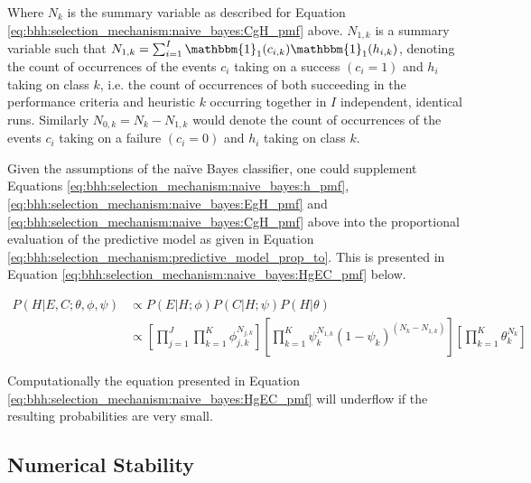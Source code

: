 Where $N_{k}$ is the summary variable as described for Equation \ref{eq:bhh:selection_mechanism:naive_bayes:CgH_pmf} above.
$N_{1,k}$ is a summary variable such that $N_{1,k} = \sum_{i=1}^{I}
      \mathbbm{1}_{1}(c_{i,k})\mathbbm{1}_{1}(h_{i,k})$, denoting the count of
occurrences of the events $c_{i}$ taking on a success $(c_{i}=1)$ and $h_{i}$
taking on class $k$, i.e. the count of occurrences of both succeeding in the
performance criteria and heuristic $k$ occurring together in $I$ independent,
identical runs. Similarly $N_{0,k} = N_{k} - N_{1,k}$ would denote the count of
occurrences of the events $c_{i}$ taking on a failure $(c_{i}=0)$ and $h_{i}$
taking on class $k$.


Given the assumptions of the naïve Bayes classifier, one could supplement Equations \ref{eq:bhh:selection_mechanism:naive_bayes:h_pmf}, \ref{eq:bhh:selection_mechanism:naive_bayes:EgH_pmf} and \ref{eq:bhh:selection_mechanism:naive_bayes:CgH_pmf} above into the proportional evaluation of the predictive model as given in Equation \ref{eq:bhh:selection_mechanism:predictive_model_prop_to}. This is presented in Equation \ref{eq:bhh:selection_mechanism:naive_bayes:HgEC_pmf} below.

\begin{equation}
      \label{eq:bhh:selection_mechanism:naive_bayes:HgEC_pmf}
      \begin{split}
            P(H \vert E, C;  \theta, \phi, \psi)
            &\propto P(E \vert H;  \phi)  P(C \vert H;  \psi) P(H \vert \theta)  \\
            &\propto \left[ \prod_{j=1}^{J} \prod_{k=1}^{K} \phi_{j,k}^{N_{j,k}} \right] \left[ \prod_{k=1}^{K} \psi_{k}^{N_{1,k}} (1 - \psi_{k})^{(N_{k} - N_{1,k})} \right] \left[ \prod_{k=1}^{K} \theta_{k}^{N_{k}} \right]
      \end{split}
\end{equation}

Computationally the equation presented in Equation \ref{eq:bhh:selection_mechanism:naive_bayes:HgEC_pmf} will underflow if the resulting probabilities are very small.


\subsection{Numerical Stability}
\label{sec:bhh:selection_mechanism:numerical_stability}

